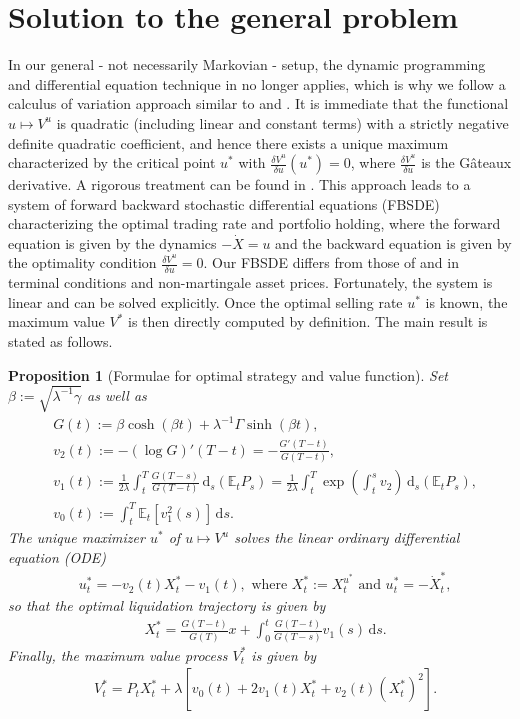 \documentclass[openany,oneside]{article}
\newtheorem{prop}[thm]{Proposition}
\theoremstyle{definition}
\theoremstyle{remark}
\newcommand{\E}{\mathbb{E}} %
\newcommand{\ts}{\textstyle}
\newcommand{\closeEqn}{\tag*{$\diamond$}}
\newcommand{\de}{\,\mathrm{d}}
\begin{document}
\section{Solution to the general problem}
In our general - not necessarily Markovian - setup, the dynamic programming and differential equation technique in \cite{lehalle2017incorporating} no longer applies, which is why we follow a calculus of variation approach similar to \cite{bank2017hedging} and \cite{bouchard2017equilibrium}. It is immediate that the functional $u\mapsto V^u$ is quadratic (including linear and constant terms) with a strictly negative definite quadratic coefficient, and hence there exists a unique maximum characterized by the critical point $u^\ast$ with $\frac{\delta V^u}{\delta u}(u^\ast) =0$, where $\frac{\delta V^u}{\delta u}$ is the G\^ateaux derivative. A rigorous treatment can be found in \cite{ekeland1999convex}. This approach leads to a system of forward backward stochastic differential equations (FBSDE) characterizing the optimal trading rate and portfolio holding, where the forward equation is given by the dynamics $-\dot{X}=u$ and the backward equation is given by the optimality condition $\frac{\delta V^u}{\delta u}=0$. Our FBSDE differs from those of \cite{bank2017hedging} and \cite{bouchard2017equilibrium} in terminal conditions and non-martingale asset prices. Fortunately, the system is linear and can be solved explicitly. Once the optimal selling rate $u^\ast$ is known, the maximum value $V^\ast$ is then directly computed by definition. The main result is stated as follows.

\begin{prop}[Formulae for optimal strategy and value function]\label{main}
Set $\beta:=\sqrt{\lambda^{-1}\gamma}$ as well as
\begin{align*}
&\ts G(t)  := \beta\cosh(\beta t)+\lambda^{-1}\Gamma\sinh(\beta t),\\
&\ts v_2(t):= -(\log G)'(T-t) = -\frac{G'(T-t)}{G(T-t)},\\
&\ts v_1(t):= \frac{1}{2\lambda}\int_t^T \frac{G(T-s)}{G(T-t)} \de_s(\E_t P_s) = \frac{1}{2\lambda}\int_t^T \exp\left(\int_t^s v_2\right) \de_s(\E_t P_s), \\
&\ts v_0(t):= \int_t^T \E_t[v_1^2(s)] \de s.
\end{align*}
The unique maximizer $u^\ast$ of $u\mapsto V^u$ solves the linear ordinary differential equation (ODE)
\begin{align*}
&\ts u^\ast_t = -v_2(t) X_t^{\ast} - v_1(t), \textrm{ where } X_t^{\ast} := X_t^{u^\ast} \textrm{ and } u^\ast_t = -\dot{X}^\ast_t,
\end{align*}
so that the optimal liquidation trajectory is given by
\begin{align*}
&\ts X^{\ast}_t = \frac{G(T-t)}{G(T)}x + \int_0^t \frac{G(T-t)}{G(T-s)} v_1(s) \de s.
\end{align*}
Finally, the maximum value process $V^\ast_t$ is given by
\begin{align*}
&\ts V^\ast_t = P_t X_t^{\ast} + \lambda\left[v_0(t) + 2 v_1(t) X_t^{\ast} + v_2(t) (X_t^{\ast})^2\right]. \closeEqn
\end{align*}
\end{prop}
\end{document}
